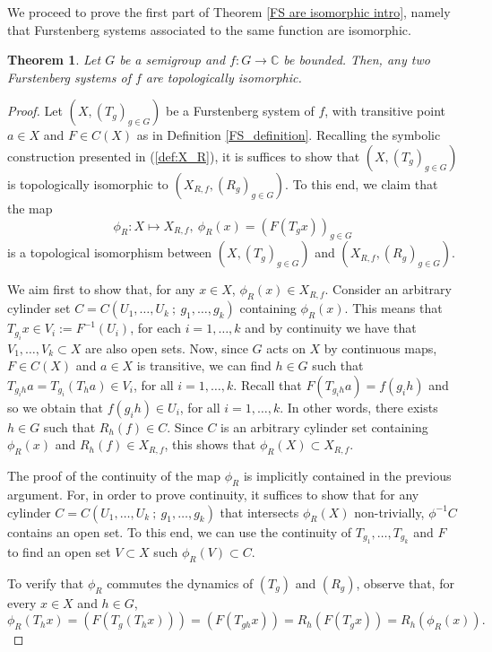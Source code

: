 \documentclass{amsart}
\numberwithin{equation}{section}
\newtheorem{theorem}[lemma]{Theorem}
\theoremstyle{definition}
\theoremstyle{plain}
\newcommand{\C}{{\mathbb C}}
\begin{document}
We proceed to prove the first part of Theorem 
\ref{FS are isomorphic intro}, namely that Furstenberg 
systems associated to the same function are isomorphic.

\begin{theorem}\label{thm:Uniqueness}
Let $G$ be a semigroup and $f:G\to \C$ be bounded. Then, any two Furstenberg 
systems of $f$
are topologically isomorphic.      
\end{theorem}


\begin{proof}
Let $(X, (T_g)_{g\in G})$ be a Furstenberg system of $f$, with transitive point $a\in X$ and $F\in C(X)$ as in Definition \ref{FS_definition}. Recalling the symbolic construction presented in (\ref{def:X_R}), it is suffices to show that $(X, (T_g)_{g\in G})$ is topologically isomorphic to $(X_{R,f},(R_g)_{g\in G})$. To this end, we claim that the map
$$\phi_R: X\mapsto X_{R,f},\ \phi_R(x)=(F(T_gx))_{g\in G}$$
is a topological isomorphism between $(X, (T_g)_{g\in G})$ and
$(X_{R,f}, (R_g)_{g\in G})$.

We aim first to show that, for any $x\in X$, $\phi_R(x)\in X_{R,f}$. Consider an arbitrary cylinder set $C=C(U_1,\ldots,U_k\ ;\ g_1,\ldots,g_k)$ containing $\phi_R(x)$. This means that $T_{g_i}x\in V_i:=F^{-1}(U_i)$, for each $i=1,\ldots,k$ and by continuity we have that $V_1,\ldots,V_k\subset X$ are also open sets. Now, since $G$ acts on $X$ by continuous maps, $F\in C(X)$ and $a\in X$ is transitive, we can find $h\in G$ such that $T_{g_ih}a=T_{g_i}(T_ha)\in V_i$, for all $i=1,\ldots,k$. Recall that $F(T_{g_ih}a)=f(g_ih)$ and so we obtain that $f(g_ih)\in U_i$, for all $i=1,\ldots,k$. In other words, there exists $h\in G$ such that $R_h(f)\in C$. Since $C$ is an arbitrary cylinder set containing $\phi_R(x)$ and $R_h(f)\in X_{R,f}$, this shows that $\phi_R(X)\subset X_{R,f}$.

The proof of the continuity of the map $\phi_R$ is 
implicitly contained in the previous argument. For, in order to prove continuity, it suffices to show that 
for any cylinder $C=C(U_1,\ldots,U_k\ ;\ g_1,\ldots,g_k)$ that intersects $\phi_R(X)$ non-trivially, $\phi^{-1}C$ contains an open set.
To this end, we can use the continuity of $T_{g_1},\ldots,T_{g_k}$ and $F$ to find an open set $V\subset X$ such $\phi_R(V) \subset C$. 

To verify that $\phi_R$ commutes the dynamics of 
$(T_g)$ and $(R_g)$, observe that, for every $x\in X$ and $h\in G$,
\begin{equation}\label{eq:2}
\phi_R(T_h x)=(F(T_g(T_hx)))=(F(T_{gh}x))=R_h(F(T_gx))=R_h(\phi_R(x)).    
\end{equation}


\end{proof}
\end{document}

